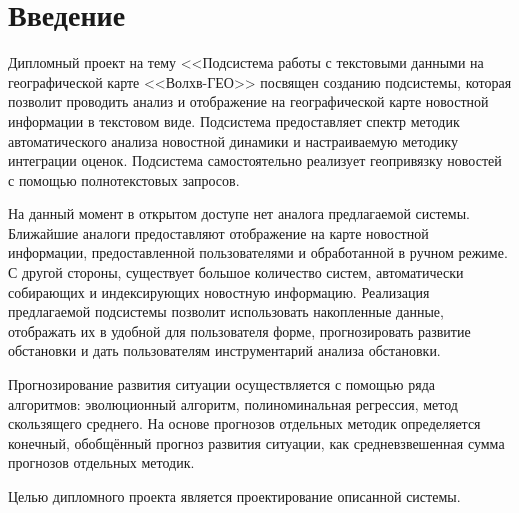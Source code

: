 \section*{Введение}

Дипломный проект на тему <<Подсистема работы с текстовыми данными на географической карте <<Волхв-ГЕО>> посвящен созданию подсистемы, которая позволит проводить анализ и отображение на географической карте новостной информации в текстовом виде. Подсистема предоставляет спектр методик автоматического анализа новостной динамики и настраиваемую методику интеграции оценок. Подсистема самостоятельно реализует геопривязку новостей с помощью полнотекстовых запросов.

На данный момент в открытом доступе нет аналога предлагаемой системы. Ближайшие аналоги предоставляют отображение на карте новостной информации, предоставленной пользователями и обработанной в ручном режиме. С другой стороны, существует большое количество систем, автоматически собирающих и индексирующих новостную информацию. Реализация предлагаемой подсистемы позволит использовать накопленные данные, отображать их в удобной для пользователя форме, прогнозировать развитие обстановки и дать пользователям инструментарий анализа обстановки.

Прогнозирование развития ситуации осуществляется с помощью ряда алгоритмов: эволюционный алгоритм, полиноминальная регрессия, метод скользящего среднего. На основе прогнозов отдельных методик определяется конечный, обобщённый прогноз развития ситуации, как средневзвешенная сумма прогнозов отдельных методик.

Целью дипломного проекта является проектирование описанной системы.